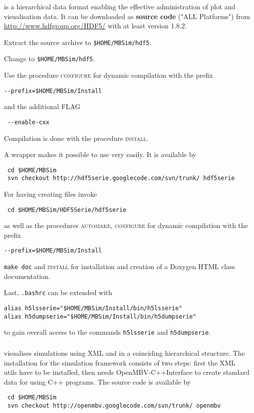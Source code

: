 \subsubsection{\HDF}
\HDF{} is a hierarchical data format enabling the effective administration of plot and visualisation data. It can be downloaded as \textbf{source code} ("ALL Platforms") 
from \url{http://www.hdfgroup.org/HDF5/} with at least version 1.8.2.\par
Extract the source archive to \texttt{\$HOME/MBSim/hdf5}.\par
Change to \texttt{\$HOME/MBSim/hdf5}.\par
Use the procedure \textsc{configure} for dynamic compilation with the prefix
\begin{verbatim}
--prefix=$HOME/MBSim/Install
\end{verbatim}
and the additional FLAG
\begin{verbatim}
 --enable-cxx
\end{verbatim}
Compilation is done with the procedure \textsc{install}.\par
A \HDF{} wrapper makes it possible to use \HDF{} very easily. It is available by
\begin{verbatim}
 cd $HOME/MBSim
 svn checkout http://hdf5serie.googlecode.com/svn/trunk/ hdf5serie
\end{verbatim}
For having \MBSim{} creating \HDF{} files invoke
\begin{verbatim}
 cd $HOME/MBSim/HDF5Serie/hdf5serie
\end{verbatim}
as well as the procedures \textsc{automake, configure} for dynamic compilation with the prefix
\begin{verbatim}
--prefix=$HOME/MBSim/Install
\end{verbatim}
\texttt{make doc} and \textsc{install} for installation and creation of a Doxygen HTML class documentation.\par
Last, \texttt{.bashrc} can be extended with
\begin{verbatim}
alias h5lsserie="$HOME/MBSim/Install/bin/h5lsserie"
alias h5dumpserie="$HOME/MBSim/Install/bin/h5dumpserie"
\end{verbatim}
to gain overall access to the commands \texttt{h5lsserie} and \texttt{h5dumpserie}.

\subsubsection{\OpenMBV{}}
\OpenMBV{} visualises \MBSim{} simulations using XML and \HDF{} in a coinciding hierarchical structure. The installation for the simulation framework consists of two steps: first the XML utils have to be installed, then \MBSim{} needs \textsf{OpenMBV-C++Interface} to create standard data for \OpenMBV{} using C++ programs. The source code is available by
\begin{verbatim}
 cd $HOME/MBSim
 svn checkout http://openmbv.googlecode.com/svn/trunk/ openmbv
\end{verbatim}

